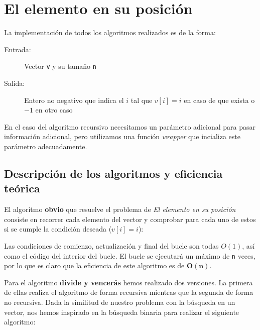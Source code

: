 \section{El elemento en su posición}

La implementación de todos los algoritmos realizados es de la forma:
\begin{description}
 \item[Entrada:] Vector \texttt{v} y su tamaño \texttt{n}
 \item[Salida:] Entero no negativo que indica el $i$ tal que $v[i]=i$ en caso de que exista o $-1$ en otro caso
\end{description}

En el caso del algoritmo recursivo necesitamos un parámetro adicional para pasar información adicional, pero utilizamos una función \textit{wrapper} que incializa este parámetro adecuadamente.

\subsection{Descripción de los algoritmos y eficiencia teórica}

El algoritmo \textbf{obvio} que resuelve el problema de \textit{El elemento en su posición} consiste
en recorrer cada elemento del vector y comprobar para cada uno de estos si se cumple la
condición deseada ($v[i] = i$):



Las condiciones de comienzo, actualización y final del bucle son todas $O(1)$, así como el código del interior del bucle. El bucle se ejecutará un máximo de \texttt{n} veces, por lo que es claro que la eficiencia de este algoritmo es de $\mathbf{O(n)}$.

\vspace*{1cm}
\hrulefill
\vspace*{1cm}

Para el algoritmo \textbf{divide y vencerás} hemos realizado dos versiones. La primera de ellas realiza el algoritmo de forma recursiva mientras que la segunda de forma no recursiva. Dada la similitud de nuestro problema con la búsqueda en un vector, nos hemos inspirado en la búsqueda binaria para realizar el siguiente algoritmo:




